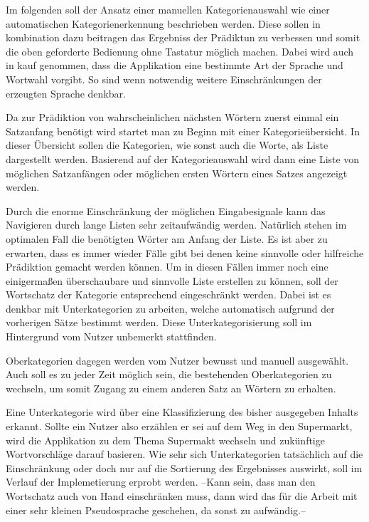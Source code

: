     	Im folgenden soll der Ansatz einer manuellen Kategorienauswahl wie einer automatischen Kategorienerkennung beschrieben werden. Diese sollen in kombination dazu beitragen das Ergebniss der Prädiktun zu verbessen und somit die oben geforderte Bedienung ohne Tastatur möglich machen. Dabei wird auch in kauf genommen, dass die Applikation eine bestimmte Art der Sprache und Wortwahl vorgibt. So sind wenn notwendig weitere Einschränkungen der erzeugten Sprache denkbar.
        
    	Da zur Prädiktion von wahrscheinlichen nächsten Wörtern zuerst einmal ein Satzanfang benötigt wird startet man zu Beginn mit einer Kategorieübersicht. In dieser Übersicht sollen die Kategorien, wie sonst auch die Worte, als Liste dargestellt werden. Basierend auf der Kategorieauswahl wird dann eine Liste von möglichen Satzanfängen oder möglichen ersten Wörtern eines Satzes angezeigt werden. 
        
        Durch die enorme Einschränkung der möglichen Eingabesignale kann das Navigieren durch lange Listen sehr zeitaufwändig werden. Natürlich stehen im optimalen Fall die benötigten Wörter am Anfang der Liste. Es ist aber zu erwarten, dass es immer wieder Fälle gibt bei denen keine sinnvolle oder hilfreiche Prädiktion gemacht werden können. Um in diesen Fällen immer noch eine einigermaßen überschaubare und sinnvolle Liste erstellen zu können, soll der Wortschatz der Kategorie entsprechend eingeschränkt werden. Dabei ist es denkbar mit Unterkategorien zu arbeiten, welche automatisch aufgrund der vorherigen Sätze bestimmt werden. Diese Unterkategorisierung soll im Hintergrund vom Nutzer unbemerkt stattfinden. 
        
        Oberkategorien dagegen werden vom Nutzer bewusst und manuell ausgewählt. Auch soll es zu jeder Zeit möglich sein, die bestehenden Oberkategorien zu wechseln, um somit Zugang zu einem anderen Satz an Wörtern zu erhalten.
        
        Eine Unterkategorie wird über eine Klassifizierung des bisher ausgegeben Inhalts erkannt. Sollte ein Nutzer also erzählen er sei auf dem Weg in den Supermarkt, wird die Applikation zu dem Thema Supermakt wechseln und zukünftige Wortvorschläge darauf basieren. Wie sehr sich Unterkategorien tatsächlich auf die Einschränkung oder doch nur auf die Sortierung des Ergebnisses auswirkt, soll im Verlauf der Implemetierung erprobt werden. --Kann sein, dass man den Wortschatz auch von Hand einschränken muss, dann wird das für die Arbeit mit einer sehr kleinen Pseudosprache geschehen, da sonst zu aufwändig.--  
        
